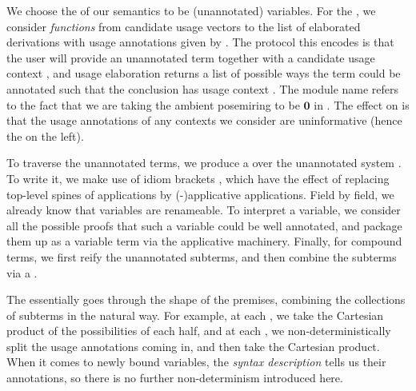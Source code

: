 
We choose the \AgdaBound{$\V$} of our semantics to be (unannotated) variables.
For the \AgdaBound{$\C$}, we consider \emph{functions} from candidate usage
vectors  to the list of elaborated derivations with usage
annotations given by .
The protocol this encodes is that the user will provide an unannotated term
together with a candidate usage context , and usage elaboration
returns a list of possible ways the term could be annotated such that the
conclusion has usage context .
The module name  refers to the fact that we are taking the
ambient posemiring to be $\mathbf0$ in .
The effect on  is that the usage annotations of any
contexts we consider are uninformative (hence the \AgdaSymbol{\_} on the left).


To traverse the unannotated terms, we produce a  over the
unannotated system \AgdaSpace{}.
To write it, we make use of idiom brackets
\AgdaSymbol{(|}\AgdaSpace{}\AgdaSymbol{$\ldots$}\AgdaSpace{}\AgdaSymbol{|)},
which have the effect of replacing top-level spines of applications by
(-)applicative applications.
Field by field, we already know that variables are renameable.
To interpret a variable, we consider all the possible proofs that such a
variable could be well annotated, and package them up as a variable term via
the applicative machinery.
Finally, for compound terms, we first reify the unannotated subterms, and then
combine the subterms via a .


The  essentially goes through the shape of the premises,
combining the collections of subterms in the natural way.
For example, at each
\AgdaInductiveConstructor{\AgdaUnderscore{}$\dottimes$\AgdaUnderscore{}},
we take the Cartesian product of the possibilities of each half, and at each
\AgdaInductiveConstructor{\AgdaUnderscore{}$\sep$\AgdaUnderscore{}},
we non-deterministically split the usage annotations coming in, and then take
the Cartesian product.
When it comes to newly bound variables, the \emph{syntax description} tells us
their annotations, so there is no further non-determinism introduced here.


